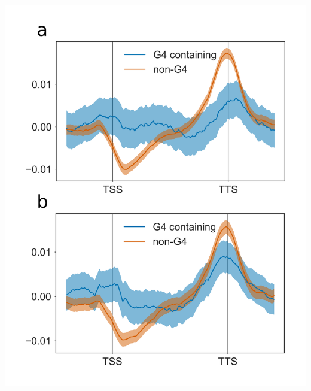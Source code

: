 \documentclass[12pt,a4paper,]{report}
\let\origfigure=\figure
\let\endorigfigure=\endfigure
\renewenvironment{figure}[1][2] {
    \expandafter\origfigure\expandafter[H]
} {
    \endorigfigure
}
\begin{document}
\begin{figure}[htbp]
\centering
\includegraphics[width=\textwidth,height=562pt,keepaspectratio]{chapter_5/figures/polii_occupancy.png}
\caption[PG4 dense genes have altered RNA Polymerase II occupancy]{\textbf{PG4   dense   genes   have   altered   RNA   Polymerase   II   occupancy}   Metagene   profiles   showing   RNA   Polymerase   II   (Pol   II)   occupancy   across   binned   exonic   gene   bodies.   Profiles   are   made   up   of   500bp   upstream   region   (in   10bp   bins),   100   gene   body   bins,   and   500bp   downstream   region   (in   10bp   bins).   \textbf{a)}   Metagene   profile   for   genes   containing   PG4   predicted   by   G4Seeqer   (max   G4seeqer   score   >   0.9),   vs. genes   containing   no   G4s   (max   G4seeqer   score   <   0.1).   \textbf{b)}   Metagene   profile   for   genes   containing   two   tetrad   maximal   PG4   density   per   200bp   of   3   or   greater,   vs. genes   with   maximal   PG4   density   of   zero   (contain   no   PG4s).   Averages   were   generated   using   1000   bootstrapped   samples   from   each   geneset.   Bootstrapped   samples   are   normalised   such   that   the   absolute   area   under   the   curve   was   equal   to   one.   Errorbars   are   68\%   confidence   intervals   for   bootstrapped   means.   \label{pol_ii}}
\end{figure}
\end{document}

